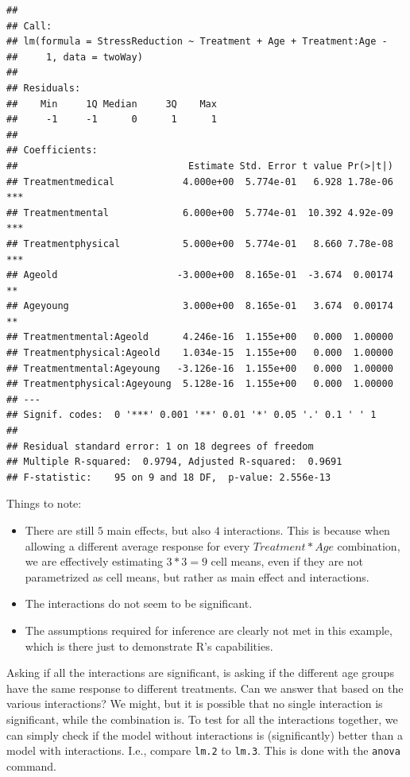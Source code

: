 \documentclass[]{book}
\providecommand{\tightlist}{%
  \setlength{\itemsep}{0pt}\setlength{\parskip}{0pt}}
\theoremstyle{definition}
\theoremstyle{definition}
\theoremstyle{definition}
\theoremstyle{remark}
\begin{document}
\begin{verbatim}
## 
## Call:
## lm(formula = StressReduction ~ Treatment + Age + Treatment:Age - 
##     1, data = twoWay)
## 
## Residuals:
##    Min     1Q Median     3Q    Max 
##     -1     -1      0      1      1 
## 
## Coefficients:
##                              Estimate Std. Error t value Pr(>|t|)    
## Treatmentmedical            4.000e+00  5.774e-01   6.928 1.78e-06 ***
## Treatmentmental             6.000e+00  5.774e-01  10.392 4.92e-09 ***
## Treatmentphysical           5.000e+00  5.774e-01   8.660 7.78e-08 ***
## Ageold                     -3.000e+00  8.165e-01  -3.674  0.00174 ** 
## Ageyoung                    3.000e+00  8.165e-01   3.674  0.00174 ** 
## Treatmentmental:Ageold      4.246e-16  1.155e+00   0.000  1.00000    
## Treatmentphysical:Ageold    1.034e-15  1.155e+00   0.000  1.00000    
## Treatmentmental:Ageyoung   -3.126e-16  1.155e+00   0.000  1.00000    
## Treatmentphysical:Ageyoung  5.128e-16  1.155e+00   0.000  1.00000    
## ---
## Signif. codes:  0 '***' 0.001 '**' 0.01 '*' 0.05 '.' 0.1 ' ' 1
## 
## Residual standard error: 1 on 18 degrees of freedom
## Multiple R-squared:  0.9794, Adjusted R-squared:  0.9691 
## F-statistic:    95 on 9 and 18 DF,  p-value: 2.556e-13
\end{verbatim}

Things to note:

\begin{itemize}
\tightlist
\item
  There are still \(5\) main effects, but also \(4\) interactions.
  This is because when allowing a different average response for every \(Treatment*Age\) combination, we are effectively estimating \(3*3=9\) cell means, even if they are not parametrized as cell means, but rather as main effect and interactions.
\item
  The interactions do not seem to be significant.
\item
  The assumptions required for inference are clearly not met in this example, which is there just to demonstrate R's capabilities.
\end{itemize}

Asking if all the interactions are significant, is asking if the different age groups have the same response to different treatments.
Can we answer that based on the various interactions?
We might, but it is possible that no single interaction is significant, while the combination is.
To test for all the interactions together, we can simply check if the model without interactions is (significantly) better than a model with interactions. I.e., compare \texttt{lm.2} to \texttt{lm.3}.
This is done with the \texttt{anova} command.
\end{document}
